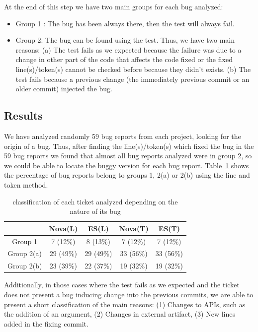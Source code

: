 \documentclass[a4paper]{article}
\begin{document}
At the end of this step we have two main groups for each bug analyzed:
\begin{itemize}
	\item Group 1 : The bug has been always there, then the test will always fail.
	\item Group 2: The bug can be found using the test. Thus, we have two main reasons: (a) The test fails as we expected because the failure was due to a change in other part of the code that affects the code fixed or  the fixed line(s)/token(s) cannot be checked before because they didn't exists. (b) The test fails because a previous change (the immediately previous commit or an older commit) injected the bug.
\end{itemize}
\subsection{Results}

We have analyzed randomly 59 bug reports from each project, looking for the origin of a bug. Thus, after finding the line(s)/token(s) which fixed the bug in the 59 bug reports we found that almost all bug reports analyzed were in group 2, so we could be able to locate the buggy version for each bug report. Table~\ref{fig:tableI} shows the percentage of bug reports belong to groups 1, 2(a) or 2(b) using the line and token method.

\begin{table}[!t]
\renewcommand{\arraystretch}{1.3}
\caption{classification of each ticket analyzed depending on the nature of its bug}
\label{fig:tableI}
\centering
\begin{tabular}{|c||c||c|c|c|}
\hline
 & Nova(L) & ES(L)& Nova(T) & ES(T) \\
\hline
Group 1 & 7 (12\%) & 8 (13\%)& 7 (12\%) & 7 (12\%)\\
\hline
Group 2(a) & 29 (49\%) & 29 (49\%)& 33 (56\%) & 33 (56\%)\\
\hline
Group 2(b) & 23 (39\%) & 22 (37\%)& 19 (32\%) & 19 (32\%)\\
\hline
\end{tabular}
\end{table}

Additionally, in those cases where the test fails as we expected and the ticket does not present a bug inducing change into the previous commits, we are able to present a short classification of the main reasons: (1) Changes to APIs, such as the addition of an argument, (2) Changes in external artifact, (3) New lines added in the fixing commit.
\end{document}
